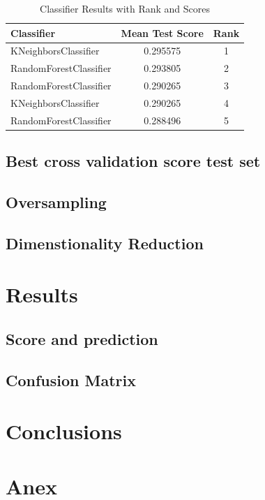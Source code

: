 \documentclass{article}
\begin{document}
\begin{table}[h!]
    \centering
    \caption{Classifier Results with Rank and Scores}
    \label{tab:classifier_ranks}
    \begin{tabular}{lcc}
    \toprule
    \textbf{Classifier}       & \textbf{Mean Test Score} & \textbf{Rank} \\
    \midrule
    KNeighborsClassifier      & 0.295575                & 1 \\
    RandomForestClassifier    & 0.293805                & 2 \\
    RandomForestClassifier    & 0.290265                & 3 \\
    KNeighborsClassifier      & 0.290265                & 4 \\
    RandomForestClassifier    & 0.288496                & 5 \\
    \bottomrule
    \end{tabular}
    \end{table}

\subsection {Best cross validation score test set}

\subsection{Oversampling}

\subsection{Dimenstionality Reduction}

\section{Results}

\subsection{Score and prediction}

\subsection{Confusion Matrix}

\section{Conclusions}


\section{Anex}



\end{document}
